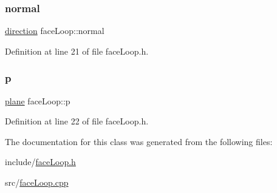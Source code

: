 \mbox{\label{classface_loop_a2ac7efac9235e5d6c6c4694f2ea8a6c2}} 
\subsubsection{\texorpdfstring{normal}{normal}}
{\footnotesize\ttfamily \mbox{\hyperlink{structdirection}{direction}} face\+Loop\+::normal}



Definition at line 21 of file face\+Loop.\+h.

\mbox{\label{classface_loop_ace3e113db57081ef98d333a5bfd32daa}} 
\subsubsection{\texorpdfstring{p}{p}}
{\footnotesize\ttfamily \mbox{\hyperlink{structplane}{plane}} face\+Loop\+::p}



Definition at line 22 of file face\+Loop.\+h.



The documentation for this class was generated from the following files\+:\begin{DoxyCompactItemize}
\item 
include/\mbox{\hyperlink{face_loop_8h}{face\+Loop.\+h}}\item 
src/\mbox{\hyperlink{face_loop_8cpp}{face\+Loop.\+cpp}}\end{DoxyCompactItemize}
